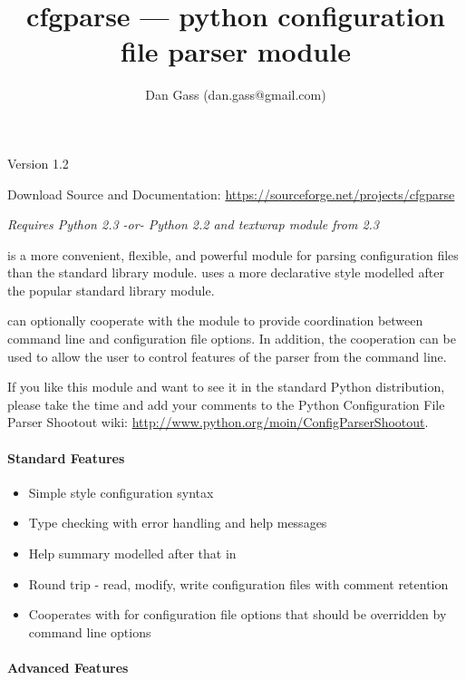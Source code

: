 \documentclass{howto}
\title{cfgparse --- python configuration file parser module}
\author{Dan Gass (dan.gass@gmail.com)}
\begin{document}
\maketitle

\begin{center}
Version 1.2

Download Source and Documentation:
\url{https://sourceforge.net/projects/cfgparse}

\textit{Requires Python 2.3 -or- Python 2.2 and textwrap module from 2.3}
\end{center}

 is a more convenient, flexible, and powerful module for parsing 
configuration files than the standard library  module.  
 uses a more declarative style modelled after the popular  
standard library module.  

 can optionally cooperate with the  module to provide
coordination between command line and configuration file options.  In addition, the 
cooperation can be used to allow the user to control features of the parser from the command line.

If you like this module and want to see it in the standard Python distribution, 
please take the time and add your comments to the Python Configuration File 
Parser Shootout wiki: \url{http://www.python.org/moin/ConfigParserShootout}.

\paragraph*{Standard Features}

\begin{itemize}
\item Simple  style configuration syntax
\item Type checking with error handling and help messages
\item Help summary modelled after that in 
\item Round trip - read, modify, write configuration files with comment retention
\item Cooperates with  for configuration file options that 
    should be overridden by command line options
\end{itemize}

\paragraph*{Advanced Features}
\end{document}
